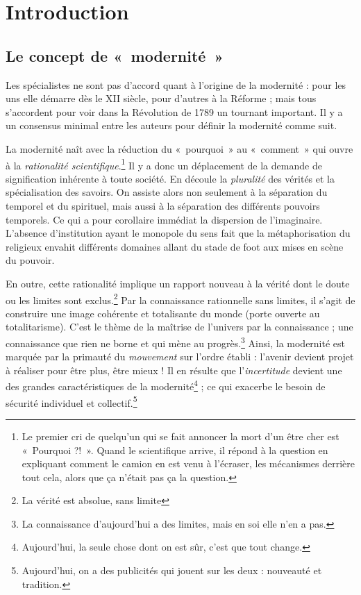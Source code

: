 \documentclass[12pt]{report}
\begin{document}
\begin{titlepage}

\end{titlepage}

\tableofcontents


\chapter*{Introduction}

\section*{Le concept de «~modernité~»}

Les spécialistes ne sont pas d’accord quant à l’origine de la modernité : pour les uns elle démarre dès le XII siècle, pour d’autres à la Réforme ; mais tous s’accordent pour voir dans la Révolution de 1789 un tournant important. Il y a un consensus minimal entre les auteurs pour définir la modernité comme suit.

La modernité naît avec la réduction du «~pourquoi~» au «~comment~» qui ouvre à la \emph{rationalité scientifique}.\footnote{Le premier cri de quelqu'un qui se fait annoncer la mort d'un être cher est «~Pourquoi ?!~». Quand le scientifique arrive, il répond à la question en expliquant comment le camion en est venu à l'écraser, les mécanismes derrière tout cela, alors que ça n'était pas ça la question.} Il y a donc un déplacement de la demande de signification inhérente à toute société. En découle la \emph{pluralité} des vérités et la spécialisation des savoirs. On assiste alors non seulement à la séparation du temporel et du spirituel, mais aussi à la séparation des différents pouvoirs temporels. Ce qui a pour corollaire immédiat la dispersion de l’imaginaire. L’absence d’institution ayant le monopole du sens fait que la métaphorisation du religieux envahit différents domaines allant du stade de foot aux mises en scène du pouvoir.

En outre, cette rationalité implique un rapport nouveau à la vérité dont le doute ou les limites sont exclus.\footnote{La vérité est absolue, sans limite} Par la connaissance rationnelle sans limites, il s’agit de construire une image cohérente et totalisante du monde (porte ouverte au totalitarisme). C’est le thème de la maîtrise de l’univers par la connaissance ; une connaissance que rien ne borne et qui mène au progrès.\footnote{La connaissance d'aujourd'hui a des limites, mais en soi elle n'en a pas.} Ainsi, la modernité est marquée par la primauté du \emph{mouvement} sur l’ordre établi : l’avenir devient projet à réaliser pour être plus, être mieux ! Il en résulte que l’\emph{incertitude} devient une des grandes caractéristiques de la modernité\footnote{Aujourd'hui, la seule chose dont on est sûr, c'est que tout change.} ; ce qui exacerbe le besoin de sécurité individuel et collectif.\footnote{Aujourd'hui, on a des publicités qui jouent sur les deux : nouveauté et tradition.}
\end{document}
